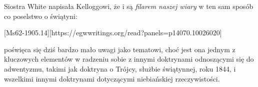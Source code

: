 Siostra White napisała Kelloggowi, że  i  są \textit{filarem naszej wiary} w ten sam sposób co poselstwo o świątyni:

[Ms62-1905.14][https://egwwritings.org/read?panels=p14070.10026020]

 poświęca się dziś bardzo mało uwagi jako tematowi, choć jest ona jednym z kluczowych elementów w radzeniu sobie z innymi doktrynami odnoszącymi się do adwentyzmu, takimi jak doktryna o Trójcy, służbie świątynnej, roku 1844, i wszelkimi innymi doktrynami dotyczącymi niebiańskiej rzeczywistości.


